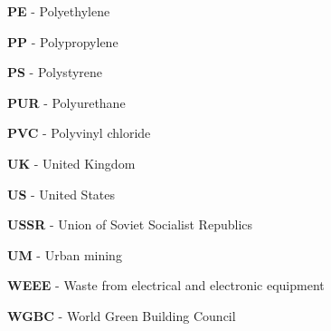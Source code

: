 \begin{scriptsize}
\begin{myitemize}
  \item[] \textbf{PE} - Polyethylene
  \item[] \textbf{PP} - Polypropylene
  \item[] \textbf{PS} - Polystyrene
  \item[] \textbf{PUR} - Polyurethane
  \item[] \textbf{PVC} - Polyvinyl chloride
  \item[] \textbf{UK} - United Kingdom
  \item[] \textbf{US} - United States
  \item[] \textbf{USSR} - Union of Soviet Socialist Republics
  \item[] \textbf{UM} - Urban mining
  \item[] \textbf{WEEE} - Waste from electrical and electronic equipment
  \item[] \textbf{WGBC} - World Green Building Council
  \end{myitemize}
\end{scriptsize}

